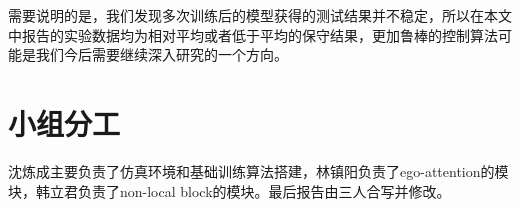 \documentclass[letterpaper, 10 pt, conference]{ieeeconf}  %
\begin{document}
需要说明的是，我们发现多次训练后的模型获得的测试结果并不稳定，所以在本文中报告的实验数据均为相对平均或者低于平均的保守结果，更加鲁棒的控制算法可能是我们今后需要继续深入研究的一个方向。

\addtolength{\textheight}{-1cm}   %









\section*{小组分工}
沈炼成主要负责了仿真环境和基础训练算法搭建，林镇阳负责了ego-attention的模块，韩立君负责了non-local block的模块。最后报告由三人合写并修改。






\end{document}
